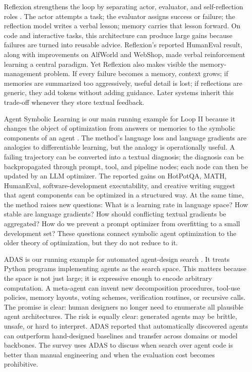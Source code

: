 Reflexion strengthens the loop by separating actor, evaluator, and self-reflection roles \cite{reflexion2023}. The actor attempts a task; the evaluator assigns success or failure; the reflection model writes a verbal lesson; memory carries that lesson forward. On code and interactive tasks, this architecture can produce large gains because failures are turned into reusable advice. Reflexion's reported HumanEval result, along with improvements on AlfWorld and WebShop, made verbal reinforcement learning a central paradigm. Yet Reflexion also makes visible the memory-management problem. If every failure becomes a memory, context grows; if memories are summarized too aggressively, useful detail is lost; if reflections are generic, they add tokens without adding guidance. Later systems inherit this trade-off whenever they store textual feedback.

Agent Symbolic Learning is our main running example for Loop II because it changes the object of optimization from answers or memories to the symbolic components of an agent \cite{agentsymboliclearning2024}. The method's language loss and language gradients are analogies to differentiable learning, but the analogy is operationally useful. A failing trajectory can be converted into a textual diagnosis; the diagnosis can be backpropagated through prompt, tool, and pipeline nodes; each node can then be updated by an LLM optimizer. The reported gains on HotPotQA, MATH, HumanEval, software-development executability, and creative writing suggest that agent components can be optimized in a structured way. At the same time, the method raises new questions: What is a learning rate in language space? How stable are language gradients? How should conflicting textual gradients be aggregated? How do we prevent a prompt optimizer from overfitting to a small development set? These questions connect symbolic agent optimization to the older theory of optimization, but they do not reduce to it.

ADAS is our running example for automated agent-design search \cite{adas2025}. It treats Python programs implementing agents as the search space. This matters because the space is not just large; it is expressive enough to encode arbitrary computation. A meta-agent can invent new decomposition procedures, tool-use policies, memory layouts, voting schemes, verification routines, or recursive calls. The promise is clear: human designers no longer need to enumerate all plausible agent architectures. The risk is equally clear: generated agents may be brittle, unsafe, or hard to interpret. ADAS reported that automatically discovered agents can outperform hand-designed baselines and transfer across domains or model backbones. The survey uses ADAS to discuss when search over agent code is better than manual engineering and when the evaluation cost becomes prohibitive.

